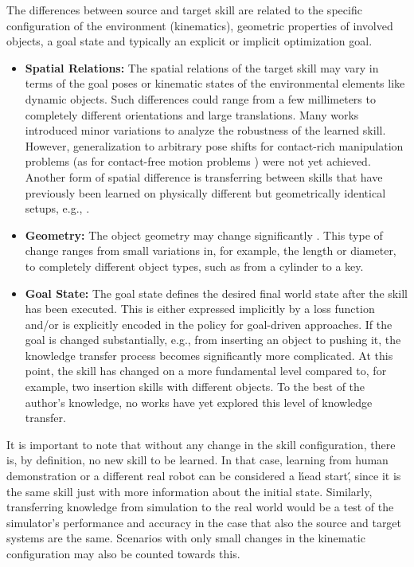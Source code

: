 The differences between source and target skill are related to the specific configuration of the environment (kinematics), geometric properties of involved objects, a goal state and typically an explicit or implicit optimization goal.
\begin{itemize}
\item \textbf{Spatial Relations:} The spatial relations of the target skill may vary in terms of the goal poses or kinematic states of the environmental elements like dynamic objects.
    Such differences could range from a few millimeters to completely different orientations and large translations.
    Many works introduced minor variations \cite{Nemec.2013} to analyze the robustness of the learned skill.
    However, generalization to arbitrary pose shifts for contact-rich manipulation problems (as for contact-free motion problems \cite{laha2021reactive}) were not yet achieved.
    Another form of spatial difference is transferring between skills that have previously been learned on physically different but geometrically identical setups, e.g., \cite{Gu.2017}.
    \item \textbf{Geometry:} The object geometry may change significantly \cite{Devin.2018,NemanjaRakicevic.2019}.
    This type of change ranges from small variations in, for example, the length or diameter, to completely different object types, such as from a cylinder to a key.
    \item \textbf{Goal State:} The goal state defines the desired final world state after the skill has been executed.
    This is either expressed implicitly by a loss function and/or is explicitly encoded in the policy for goal-driven approaches.
    If the goal is changed substantially, e.g., from inserting an object to pushing it, the knowledge transfer process becomes significantly more complicated.
    At this point, the skill has changed on a more fundamental level compared to, for example, two insertion skills with different objects.
    To the best of the author's knowledge, no works have yet explored this level of knowledge transfer.
\end{itemize}

It is important to note that without any change in the skill configuration, there is, by definition, no new skill to be learned.
In that case, learning from human demonstration or a different real robot can be considered a \'head start\', since it is the same skill just with more information about the initial state.
Similarly, transferring knowledge from simulation to the real world would be a test of the simulator's performance and accuracy in the case that also the source and target systems are the same.
Scenarios with only small changes in the kinematic configuration may also be counted towards this.

